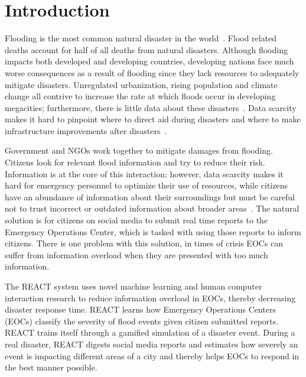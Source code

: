 \chapter{Introduction} Flooding is the most common natural disaster in the
world~\cite{chanFloodRiskAsia2012}.  Flood related deaths account for half of
all deaths from natural disasters.  Although flooding impacts both developed and
developing countries, developing nations face much worse consequences as a
result of flooding since they lack resources to adequately mitigate disasters.
Unregulated urbanization, rising population and climate change all contrive to
increase the rate at which floods occur in developing megacities; furthermore,
there is little data about these disasters~\cite{chanResilientFloodRisk2018}.
Data scarcity makes it hard to
pinpoint where to direct aid during disasters and where to make infrastructure
improvements after disasters~\cite{ranaMultidimensionalModelVulnerability2018}.

Government and NGOs work together to mitigate damages from flooding.  Citizens
look for relevant flood information and try to reduce their risk.  Information
is at the core of this interaction; however, data scarcity makes it hard for
emergency personnel to optimize their use of resources, while citizens have an
abundance of information about their surroundings but must be careful not to
trust incorrect or outdated information about broader
areas~\cite{quarantelliProblematicalAspectsInformation1997}.  The natural
solution is for citizens on social media to submit real time reports to the
Emergency Operations Center, which is tasked with using those reports to inform
citizens.  There is one problem with this solution, in times of crisis EOCs can
suffer from information overload when they are presented with too much
information.

The REACT system uses novel machine learning and human computer interaction
research to reduce information overload in EOCs, thereby decreasing disaster
response time. REACT learns how Emergency Operations Centers (EOCs) classify the
severity of flood events given citizen submitted reports. REACT trains itself
through a gamified simulation of a disaster event. During a real disaster, REACT
digests social media reports and estimates how severely an event is impacting
different areas of a city and thereby helps EOCs to respond in the best manner
possible.

